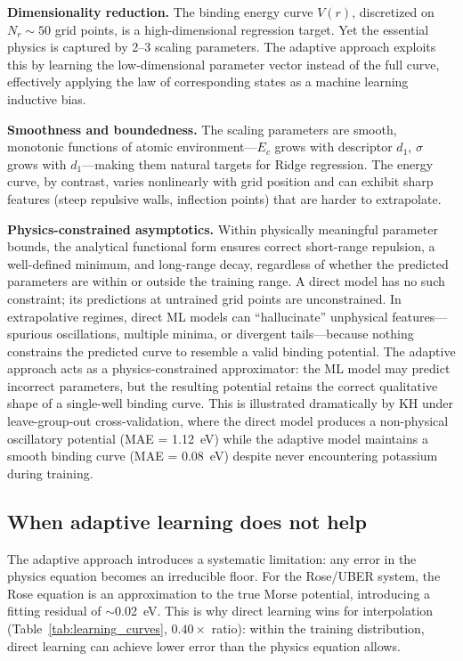 \documentclass[aps,prb,twocolumn,superscriptaddress,longbibliography,floatfix]{revtex4-2}
\begin{document}
\textbf{Dimensionality reduction.} The binding energy curve $V(r)$, discretized on $N_r \sim 50$ grid points, is a high-dimensional regression target. Yet the essential physics is captured by 2--3 scaling parameters. The adaptive approach exploits this by learning the low-dimensional parameter vector instead of the full curve, effectively applying the law of corresponding states as a machine learning inductive bias.

\textbf{Smoothness and boundedness.} The scaling parameters are smooth, monotonic functions of atomic environment---$E_c$ grows with descriptor $d_1$, $\sigma$ grows with $d_1$---making them natural targets for Ridge regression. The energy curve, by contrast, varies nonlinearly with grid position and can exhibit sharp features (steep repulsive walls, inflection points) that are harder to extrapolate.

\textbf{Physics-constrained asymptotics.} Within physically meaningful parameter bounds, the analytical functional form ensures correct short-range repulsion, a well-defined minimum, and long-range decay, regardless of whether the predicted parameters are within or outside the training range. A direct model has no such constraint; its predictions at untrained grid points are unconstrained. In extrapolative regimes, direct ML models can ``hallucinate'' unphysical features---spurious oscillations, multiple minima, or divergent tails---because nothing constrains the predicted curve to resemble a valid binding potential. The adaptive approach acts as a physics-constrained approximator: the ML model may predict incorrect parameters, but the resulting potential retains the correct qualitative shape of a single-well binding curve. This is illustrated dramatically by KH under leave-group-out cross-validation, where the direct model produces a non-physical oscillatory potential (MAE = 1.12~eV) while the adaptive model maintains a smooth binding curve (MAE = 0.08~eV) despite never encountering potassium during training.

\subsection{When adaptive learning does not help}
\label{sec:limitations}

The adaptive approach introduces a systematic limitation: any error in the physics equation becomes an irreducible floor. For the Rose/UBER system, the Rose equation is an approximation to the true Morse potential, introducing a fitting residual of $\sim$0.02~eV. This is why direct learning wins for interpolation (Table~\ref{tab:learning_curves}, $0.40\times$ ratio): within the training distribution, direct learning can achieve lower error than the physics equation allows.
\end{document}
